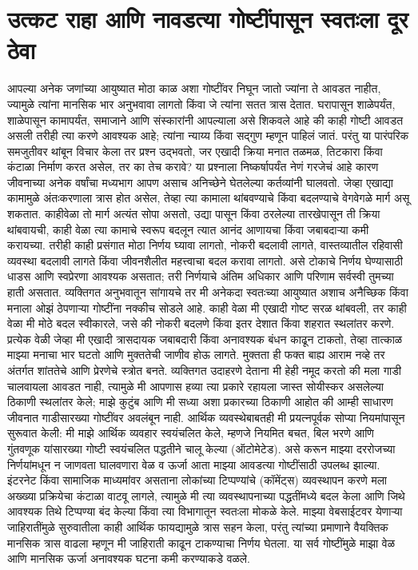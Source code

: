  \chapter{उत्कट राहा आणि नावडत्या गोष्टींपासून स्वतःला दूर ठेवा}
आपल्या अनेक जणांच्या आयुष्यात मोठा काळ अशा गोष्टींवर निघून जातो ज्यांना ते आवडत नाहीत, ज्यामुळे त्यांना मानसिक भार अनुभवावा लागतो किंवा जे त्यांना सतत त्रास देतात. घरापासून शाळेपर्यंत, शाळेपासून कामापर्यंत, समाजाने आणि संस्कारांनी आपल्याला असे शिकवले आहे की काही गोष्टी आवडत असली तरीही त्या करणे आवश्यक आहे; त्यांना न्याय्य किंवा सद्गुण म्हणून पाहिलं जातं. परंतु या पारंपरिक समजुतीवर थांबून विचार केला तर प्रश्न उद्भवतो, जर एखादी क्रिया मनात तळमळ, तिटकारा किंवा कंटाळा निर्माण करत असेल, तर का तेच करावे? या प्रश्नाला निष्कर्षापर्यंत नेणं गरजेचं आहे कारण जीवनाच्या अनेक वर्षांचा मध्यभाग आपण असाच अनिच्छेने घेतलेल्या कर्तव्यांनी घालवतो.
जेव्हा एखाद्या कामामुळे अंतःकरणाला त्रास होत असेल, तेव्हा त्या कामाला थांबवण्याचे किंवा बदलण्याचे वेगवेगळे मार्ग असू शकतात. काहीवेळा तो मार्ग अत्यंत सोपा असतो, उद्या पासून किंवा ठरलेल्या तारखेपासून ती क्रिया थांबवायची, काही वेळा त्या कामाचे स्वरूप बदलून त्यात आनंद आणायचा किंवा जबाबदाऱ्या कमी करायच्या. तरीही काही प्रसंगात मोठा निर्णय घ्यावा लागतो, नोकरी बदलावी लागते, वास्तव्यातील रहिवासी व्यवस्था बदलावी लागते किंवा जीवनशैलीत महत्त्वाचा बदल करावा लागतो. असे टोकाचे निर्णय घेण्यासाठी धाडस आणि स्वप्रेरणा आवश्यक असतात; तरी निर्णयाचे अंतिम अधिकार आणि परिणाम सर्वस्वी तुमच्या हाती असतात.
व्यक्तिगत अनुभवातून सांगायचे तर मी अनेकदा स्वतःच्या आयुष्यात अशाच अनैच्छिक किंवा मनाला ओझं ठेपणाऱ्या गोष्टींना नक्कीच सोडले आहे. काही वेळा मी एखादी गोष्ट सरळ थांबवली, तर काही वेळा मी मोठे बदल स्वीकारले, जसे की नोकरी बदलणे किंवा इतर देशात किंवा शहरात स्थलांतर करणे. प्रत्येक वेळी जेव्हा मी एखादी त्रासदायक जबाबदारी किंवा अनावश्यक बंधन काढून टाकतो, तेव्हा तात्काळ माझ्या मनाचा भार घटतो आणि मुक्ततेची जाणीव होऊ लागते. मुक्तता ही फक्त बाह्य आराम नव्हे तर अंतर्गत शांततेचे आणि प्रेरणेचे स्त्रोत बनते.
व्यक्तिगत उदाहरणे देताना मी हेही नमूद करतो की मला गाडी चालवायला आवडत नाही, त्यामुळे मी आपणास हव्या त्या प्रकारे रहायला जास्त सोयीस्कर असलेल्या ठिकाणी स्थलांतर केले; माझे कुटुंब आणि मी सध्या अशा प्रकारच्या ठिकाणी आहोत की आम्ही साधारण जीवनात गाडीसारख्या गोष्टींवर अवलंबून नाही. आर्थिक व्यवस्थेबाबतही मी प्रयत्नपूर्वक सोप्या नियमांपासून सुरूवात केली: मी माझे आर्थिक व्यवहार स्वयंचलित केले, म्हणजे नियमित बचत, बिल भरणे आणि गुंतवणूक यांसारख्या गोष्टी स्वयंचलित पद्धतीने चालू केल्या (ऑटोमेटेड). असे करून माझ्या दररोजच्या निर्णयांमधून न जाणवता घालवणारा वेळ व ऊर्जा आता माझ्या आवडत्या गोष्टींसाठी उपलब्ध झाल्या.
इंटरनेट किंवा सामाजिक माध्यमांवर असताना लोकांच्या टिप्पण्यांचे (कॉमेंट्स) व्यवस्थापन करणे मला अख्ख्या प्रक्रियेचा कंटाळा वाटवू लागले, त्यामुळे मी त्या व्यवस्थापनाच्या पद्धतींमध्ये बदल केला आणि जिथे आवश्यक तिथे टिप्पण्या बंद केल्या किंवा त्या विभागातून स्वतःला मोकळे केले. माझ्या वेबसाईटवर येणाऱ्या जाहिरातींमुळे सुरुवातीला काही आर्थिक फायद्यामुळे त्रास सहन केला, परंतु त्यांच्या प्रमाणाने वैयक्तिक मानसिक त्रास वाढला म्हणून मी जाहिराती काढून टाकण्याचा निर्णय घेतला. या सर्व गोष्टींमुळे माझा वेळ आणि मानसिक ऊर्जा अनावश्यक घटना कमी करण्याकडे वळले.
